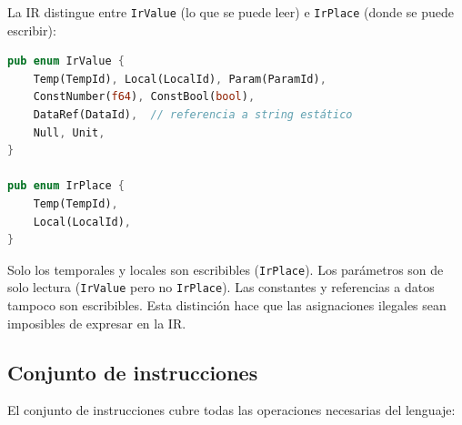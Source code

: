 \documentclass[12pt,letterpaper]{article}
\newcommand{\src}[1]{\texttt{#1}}
\begin{document}
La IR distingue entre \src{IrValue} (lo que se puede leer) e \src{IrPlace} (donde se puede escribir):

\begin{lstlisting}[language=Rust,caption={Valores y lugares en IR}]
pub enum IrValue {
    Temp(TempId), Local(LocalId), Param(ParamId),
    ConstNumber(f64), ConstBool(bool),
    DataRef(DataId),  // referencia a string estático
    Null, Unit,
}

pub enum IrPlace {
    Temp(TempId),
    Local(LocalId),
}
\end{lstlisting}

Solo los temporales y locales son escribibles (\src{IrPlace}). Los parámetros son de solo lectura (\src{IrValue} pero no \src{IrPlace}). Las constantes y referencias a datos tampoco son escribibles. Esta distinción hace que las asignaciones ilegales sean imposibles de expresar en la IR.

\subsection{Conjunto de instrucciones}

El conjunto de instrucciones cubre todas las operaciones necesarias del lenguaje:
\end{document}
